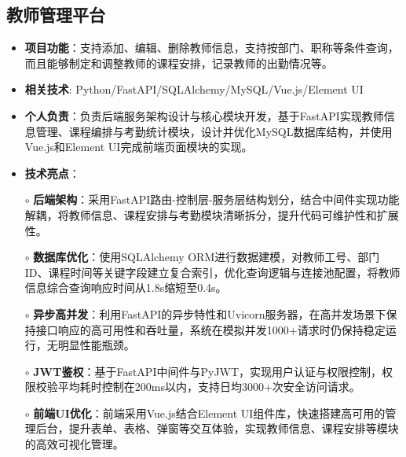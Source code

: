 \subsection{\textbf{教师管理平台} \hspace{2cm}{2024.07 -- 2024.09}}
  \begin{normalsize}
    \begin{itemize}
    \item \textbf{项目功能}：支持添加、编辑、删除教师信息，支持按部门、职称等条件查询，而且能够制定和调整教师的课程安排，记录教师的出勤情况等。
    \item \textbf{相关技术}: Python/FastAPI/SQLAlchemy/MySQL/Vue.js/Element UI
    \item \textbf{个人负责}：负责后端服务架构设计与核心模块开发，基于FastAPI实现教师信息管理、课程编排与考勤统计模块，设计并优化MySQL数据库结构，并使用Vue.js和Element UI完成前端页面模块的实现。
    \item \textbf{技术亮点}：
    \setlength{\itemindent}{1em} %
      \item[$\circ$] \textbf{后端架构}：采用FastAPI路由-控制层-服务层结构划分，结合中间件实现功能解耦，将教师信息、课程安排与考勤模块清晰拆分，提升代码可维护性和扩展性。
      \item[$\circ$] \textbf{数据库优化}：使用SQLAlchemy ORM进行数据建模，对教师工号、部门ID、课程时间等关键字段建立复合索引，优化查询逻辑与连接池配置，将教师信息综合查询响应时间从1.8s缩短至0.4s。
      \item[$\circ$] \textbf{异步高并发}：利用FastAPI的异步特性和Uvicorn服务器，在高并发场景下保持接口响应的高可用性和吞吐量，系统在模拟并发1000+请求时仍保持稳定运行，无明显性能瓶颈。
      \item[$\circ$] \textbf{JWT鉴权}：基于FastAPI中间件与PyJWT，实现用户认证与权限控制，权限校验平均耗时控制在200ms以内，支持日均3000+次安全访问请求。
      \item[$\circ$] \textbf{前端UI优化}：前端采用Vue.js结合Element UI组件库，快速搭建高可用的管理后台，提升表单、表格、弹窗等交互体验，实现教师信息、课程安排等模块的高效可视化管理。
    \end{itemize}
  \end{normalsize}